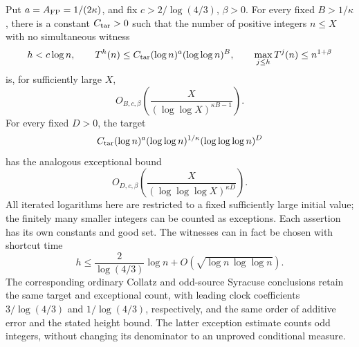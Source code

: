 \begin{corollary}
\label{cor:Shaik-critical-rates}
Put \(a=A_{\rm FP}=1/(2\kappa)\), and fix
\(c>2/\log(4/3)\), \(\beta>0\).
For every fixed \(B>1/\kappa\), there is a constant \(C_{\rm tar}>0\)
such that the number of positive integers \(n\le X\) with no simultaneous
witness
\[
 h<c\log n,\qquad
 T^h(n)\le C_{\rm tar}(\log n)^a(\log\log n)^B,\qquad
 \max_{j\le h}T^j(n)\le n^{1+\beta}
\]
is, for sufficiently large \(X\),
\begin{equation}\label{eq:Shaik-critical-B-rate}
 O_{B,c,\beta}\left(\frac{X}{(\log\log X)^{\kappa B-1}}\right).
\end{equation}
For every fixed \(D>0\), the target
\[
 C_{\rm tar}(\log n)^a(\log\log n)^{1/\kappa}
                      (\log\log\log n)^D
\]
has the analogous exceptional bound
\begin{equation}\label{eq:Shaik-critical-D-rate}
 O_{D,c,\beta}\left(\frac{X}{(\log\log\log X)^{\kappa D}}\right).
\end{equation}
All iterated logarithms here are restricted to a fixed sufficiently
large initial value; the finitely many smaller integers can be counted
as exceptions. Each assertion has its own constants and good set.
The witnesses can in fact be chosen with shortcut time
\[
 h\le\frac{2}{\log(4/3)}\log n+
       O(\sqrt{\log n\,\log\log n}).
\]
The corresponding ordinary Collatz and odd-source Syracuse conclusions
retain the same target and exceptional count, with leading clock
coefficients \(3/\log(4/3)\) and \(1/\log(4/3)\), respectively, and
the same order of additive error and the stated height bound.
The latter exception estimate counts odd integers, without changing its
denominator to an unproved conditional measure.
\end{corollary}
